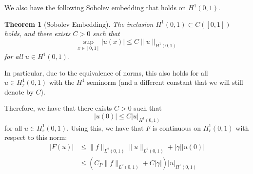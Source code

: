 \documentclass{article}
\theoremstyle{plain}
\newtheorem{theorem}{Theorem}
\theoremstyle{definition}
\begin{document}
We also have the following Sobolev embedding that holds on $H^1(0,1)$.
\begin{theorem}[Sobolev Embedding]
  The inclusion $H^1(0,1) \subset C([0,1])$ holds, and there exists $C > 0$ such that
  \begin{equation}
    \sup_{x\in[0,1]}|u(x)| \leq C\|u\|_{H^1(0,1)}
  \end{equation}
  for all $u \in H^1(0,1)$.
\end{theorem}
In particular, due to the equivalence of norms, this also holds for all $u \in H^1_r(0,1)$ with the $H^1$ seminorm (and a different constant that we will still denote by $C$).

Therefore, we have that there exists $C > 0$ such that
\begin{equation}
  |u(0)| \leq C |u|_{H^1(0,1)}
\end{equation}
for all $u \in H^1_r(0,1)$.
Using this, we have that $F$ is continuous on $H^1_r(0,1)$ with respect to this norm:
\begin{align}\label{eq:continuous}
  |F(u)| & \leq \|f\|_{L^2(0,1)}\|u\|_{L^2(0,1)} + |\gamma| |u(0)| \\ & \leq \left(C_P\|f\|_{L^2(0,1)} + C|\gamma|\right)|u|_{H^1(0,1)}
\end{align}
\end{document}
